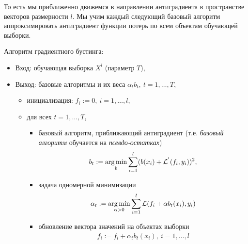 \documentclass[%
	11pt,
	a4paper,
	utf8,
		]{article}
\begin{document}
То есть мы приближенно движемся в направлении антиградиента в пространстве векторов размерности $ l $. Мы учим каждый следующий базовый алгоритм аппроксимировать антиградиент функции потерь по всем объектам обучающей выборки.

Алгоритм градиентного бустинга:
\begin{itemize}
	\item Вход: обучающая выборка $ X^l $ (параметр $ T $),
	
	\item Выход: базовые алгоритмы и их веса $ \alpha_t b_t, \ t = 1, \ldots, T $,
	
	\begin{itemize}
		\item инициализация: $ f_i := 0,\  i = 1, \ldots, l $,
		
		\item для всех $ t = 1, \ldots, T $,
		
		\begin{itemize}
		
		\item базовый алгоритм, приближающий антиградиент ({\color{blue}т.е. \emph{базовый алгоритм} обучается на \emph{псевдо-остатках}})
	\begin{align*}
		b_t := \underset{b}{\operatorname*{arg\,min}} \sum_{i=1}^{l} (b(x_i) + \mathcal{L}^{'}(f_i, y_i))^2,
	\end{align*}

        \item задача одномерной минимизации
        \begin{align*}
        	\alpha_t := \underset{\alpha > 0}{\operatorname*{arg\,min}} \sum_{i=1}^{l} \mathcal{L}(f_i + \alpha b_t(x_i), y_i)
        \end{align*}
    
        \item обновление вектора значений на объектах выборки
        \begin{align*}
        	f_i := f_i + \alpha_t b_t(x_i), \ i = 1, \ldots, l
        \end{align*}
    	\end{itemize}
	\end{itemize}
\end{itemize}
\end{document}
